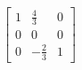\[
  \left[
  \begin{array}{ccc}
	  1 & \frac{4}{3} & 0 \\
	  0 & 0 & 0 \\
	  0 & -\frac{2}{3} & 1
  \end{array}
  \right]
  \]